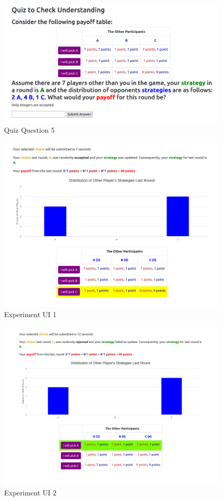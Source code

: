 \begin{figure}[h]
\captionsetup{justification=centering}
  \caption{Quiz Question 5}
   \label{fig:QuizQ5}
    \includegraphics[width = \textwidth]{Images/Q5.png}    
\end{figure}

\begin{figure}[h]
\captionsetup{justification=centering}
  \caption{Experiment UI 1}
   \label{fig:UI1}
    \includegraphics[width = \textwidth]{Images/Game1Choice.png}
\end{figure}

\begin{figure}[h]
\captionsetup{justification=centering}
  \caption{Experiment UI 2}
   \label{fig:UI2}
    \includegraphics[width = \textwidth]{Images/Game1Reject.png}
\end{figure}



